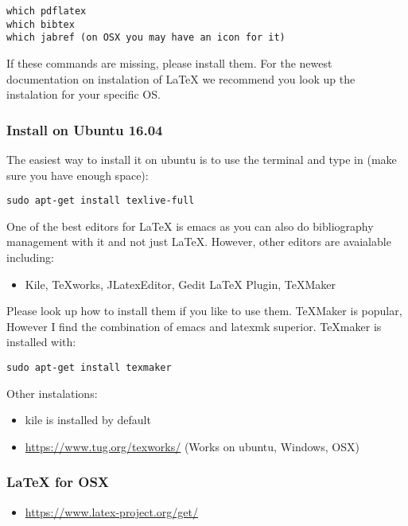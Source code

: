 \begin{verbatim}
which pdflatex
which bibtex
which jabref (on OSX you may have an icon for it)
\end{verbatim}

If these commands are missing, please install them. For the newest
documentation on instalation of LaTeX we recommend you look up the
instalation for your specific OS.

\subsubsection{Install on Ubuntu 16.04}\label{install-on-ubuntu-16.04}

The easiest way to install it on ubuntu is to use the terminal and type
in (make sure you have enough space):

\begin{verbatim}
sudo apt-get install texlive-full
\end{verbatim}

One of the best editors for LaTeX is emacs as you can also do
bibliography management with it and not just LaTeX. However, other
editors are avaialable including:

\begin{itemize}
\tightlist
\item
  Kile, TeXworks, JLatexEditor, Gedit LaTeX Plugin, TeXMaker
\end{itemize}

Please look up how to install them if you like to use them. TeXMaker is
popular, However I find the combination of emacs and latexmk superior.
TeXmaker is installed with:

\begin{verbatim}
sudo apt-get install texmaker
\end{verbatim}

Other instalations:

\begin{itemize}
\tightlist
\item
  kile is installed by default
\item
  \url{https://www.tug.org/texworks/} (Works on ubuntu, Windows, OSX)
\end{itemize}

\subsubsection{LaTeX for OSX}\label{latex-for-osx}

\begin{itemize}
\tightlist
\item
  \url{https://www.latex-project.org/get/}
\end{itemize}


